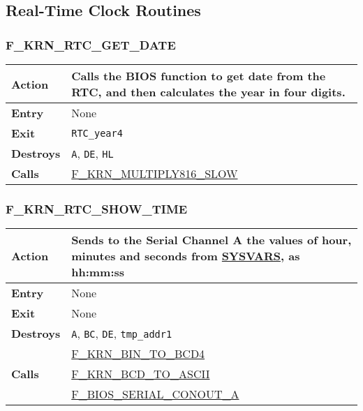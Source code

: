 \subsection{Real-Time Clock Routines}

    \subsubsection{F\_KRN\_RTC\_GET\_DATE}
    \label{func:fkrnrtcgetdate}
    \begin{tabular}{l p{15cm}}
        \hline\textbf{Action}
        & Calls the BIOS function to get date from the RTC, and then
        calculates the year in four digits. \\
        \hline\textbf{Entry} & None \\
        \hline\textbf{Exit} & \texttt{RTC\_year4}\\
        \hline\textbf{Destroys} & \texttt{A}, \texttt{DE}, \texttt{HL} \\
        \hline\textbf{Calls}
        & \hyperref[func:fkrnmultiply816slow]{F\_KRN\_MULTIPLY816\_SLOW}\\
        \hline
    \end{tabular}

    \subsubsection{F\_KRN\_RTC\_SHOW\_TIME}
    \label{func:fkrnrtcshowtime}
    \begin{tabular}{l p{15cm}}
        \hline\textbf{Action}
        & Sends to the \textbf{Serial Channel} A the values of hour, minutes
        and seconds from \hyperref[sec:ram_memmap]{SYSVARS}, as hh:mm:ss\\
        \hline\textbf{Entry} & None \\
        \hline\textbf{Exit} & None \\
        \hline\textbf{Destroys} & \texttt{A}, \texttt{BC}, \texttt{DE},
        \texttt{tmp\_addr1}\\
        \hline\multirow[t]{3}{4em}{\textbf{Calls}}
        & \hyperref[func:fkrnbintobcd4]{F\_KRN\_BIN\_TO\_BCD4}\\
        & \hyperref[func:fkrnbcdtoascii]{F\_KRN\_BCD\_TO\_ASCII}\\
        & \hyperref[func:fbiosserialconouta]{F\_BIOS\_SERIAL\_CONOUT\_A}\\
        \hline
    \end{tabular}


